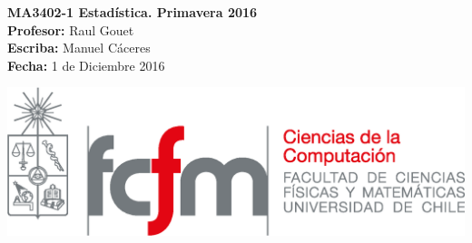 \documentclass[10pt]{article}
\theoremstyle{plain}
\theoremstyle{definition}
\newcommand{\fecha}{1 de Diciembre 2016 }
\begin{document}
\vspace*{-1.2 cm}
\begin{minipage}{0.6\textwidth}
\begin{flushleft}
\hspace*{-0.5cm}\textbf{MA3402-1 Estadística. Primavera 2016}\\
\hspace*{-0.5cm}\textbf{Profesor:} Raul Gouet\\
\hspace*{-0.5cm}\textbf{Escriba:} Manuel Cáceres\\
\hspace*{-0.5cm}\textbf{Fecha:} \fecha
\end{flushleft}
\end{minipage}
\begin{minipage}{0.36\textwidth}
\begin{flushright}
\includegraphics[scale=0.3]{imagenes/fcfm_dcc}
\end{flushright}
\end{minipage}
\bigskip
\end{document}
